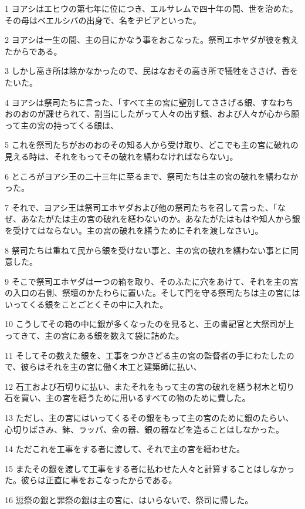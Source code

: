 \par 1 ヨアシはエヒウの第七年に位につき、エルサレムで四十年の間、世を治めた。その母はベエルシバの出身で、名をヂビアといった。
\par 2 ヨアシは一生の間、主の目にかなう事をおこなった。祭司エホヤダが彼を教えたからである。
\par 3 しかし高き所は除かなかったので、民はなおその高き所で犠牲をささげ、香をたいた。
\par 4 ヨアシは祭司たちに言った、「すべて主の宮に聖別してささげる銀、すなわちおのおのが課せられて、割当にしたがって人々の出す銀、および人々が心から願って主の宮の持ってくる銀は、
\par 5 これを祭司たちがおのおのその知る人から受け取り、どこでも主の宮に破れの見える時は、それをもってその破れを繕わなければならない」。
\par 6 ところがヨアシ王の二十三年に至るまで、祭司たちは主の宮の破れを繕わなかった。
\par 7 それで、ヨアシ王は祭司エホヤダおよび他の祭司たちを召して言った、「なぜ、あなたがたは主の宮の破れを繕わないのか。あなたがたはもはや知人から銀を受けてはならない。主の宮の破れを繕うためにそれを渡しなさい」。
\par 8 祭司たちは重ねて民から銀を受けない事と、主の宮の破れを繕わない事とに同意した。
\par 9 そこで祭司エホヤダは一つの箱を取り、そのふたに穴をあけて、それを主の宮の入口の右側、祭壇のかたわらに置いた。そして門を守る祭司たちは主の宮にはいってくる銀をことごとくその中に入れた。
\par 10 こうしてその箱の中に銀が多くなったのを見ると、王の書記官と大祭司が上ってきて、主の宮にある銀を数えて袋に詰めた。
\par 11 そしてその数えた銀を、工事をつかさどる主の宮の監督者の手にわたしたので、彼らはそれを主の宮に働く木工と建築師に払い、
\par 12 石工および石切りに払い、またそれをもって主の宮の破れを繕う材木と切り石を買い、主の宮を繕うために用いるすべての物のために費した。
\par 13 ただし、主の宮にはいってくるその銀をもって主の宮のために銀のたらい、心切りばさみ、鉢、ラッパ、金の器、銀の器などを造ることはしなかった。
\par 14 ただこれを工事をする者に渡して、それで主の宮を繕わせた。
\par 15 またその銀を渡して工事をする者に払わせた人々と計算することはしなかった。彼らは正直に事をおこなったからである。
\par 16 愆祭の銀と罪祭の銀は主の宮に、はいらないで、祭司に帰した。
